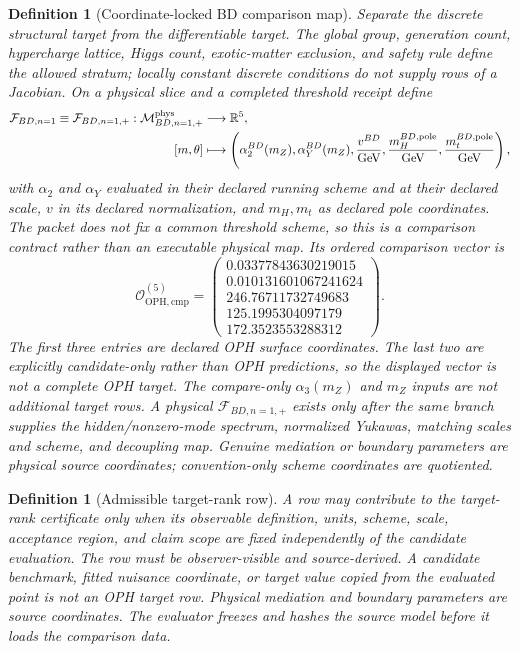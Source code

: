 \documentclass[11pt]{article}
\newtheorem{definition}[theorem]{Definition}
\theoremstyle{remark}
\theoremstyle{plain}
\newcommand{\OPH}{\mathrm{OPH}}
\newcommand{\calF}{\mathcal F}
\newcommand{\calO}{\mathcal O}
\begin{document}
\begin{definition}[Coordinate-locked BD comparison map]\label{def:bd-target-map}
Separate the discrete structural target from the differentiable target. The global group,
generation count, hypercharge lattice, Higgs count, exotic-matter exclusion, and safety rule define
the allowed stratum; locally constant discrete conditions do not supply rows of a Jacobian. On a
physical slice and a completed threshold receipt define
\[
\begin{split}
\calF_{BD,n=1}\equiv\calF_{BD,n=1,+}:
\mathcal M^{\rm phys}_{BD,n=1,+}&\longrightarrow\mathbb R^5,\\
[m,\theta]&\longmapsto
\left(
\alpha_2^{BD}(m_Z),
\alpha_Y^{BD}(m_Z),
\frac{v^{BD}}{\mathrm{GeV}},
\frac{m_H^{BD,\mathrm{pole}}}{\mathrm{GeV}},
\frac{m_t^{BD,\mathrm{pole}}}{\mathrm{GeV}}
\right),
\end{split}
\]
with \(\alpha_2\) and \(\alpha_Y\) evaluated in their declared running scheme and at their
declared scale, \(v\) in its declared normalization, and \(m_H,m_t\) as declared pole
coordinates. The packet does not fix a common threshold scheme, so this is a comparison contract
rather than an executable physical map. Its ordered comparison vector is
\[
\calO_{\OPH,\mathrm{cmp}}^{(5)}=
\begin{pmatrix}
0.03377843630219015\\
0.010131601067241624\\
246.76711732749683\\
125.1995304097179\\
172.3523553288312
\end{pmatrix}.
\]
The first three entries are declared OPH surface coordinates. The last two are explicitly
candidate-only rather than OPH predictions, so the displayed vector is not a complete OPH
target. The compare-only \(\alpha_3(m_Z)\) and \(m_Z\) inputs are not additional target rows. A physical
\(\calF_{BD,n=1,+}\) exists only after the same branch supplies the hidden/nonzero-mode
spectrum, normalized Yukawas, matching scales and scheme, and decoupling map. Genuine mediation
or boundary parameters are physical source coordinates; convention-only scheme coordinates are
quotiented.
\end{definition}

\begin{definition}[Admissible target-rank row]
A row may contribute to the target-rank certificate only when its observable definition, units,
scheme, scale, acceptance region, and claim scope are fixed independently of the candidate
evaluation. The row must be observer-visible and source-derived. A candidate benchmark, fitted
nuisance coordinate, or target value copied from the evaluated point is not an OPH target row.
Physical mediation and boundary parameters are source coordinates. The evaluator freezes and
hashes the source model before it loads the comparison data.
\end{definition}
\end{document}
